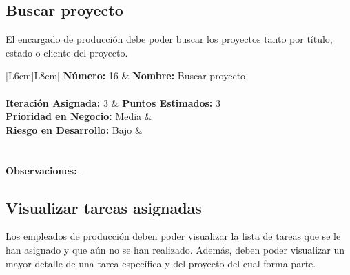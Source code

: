 \documentclass[a4paper, 12pt,twoside]{report}  %
\numberwithin{equation}{subsection} %
\begin{document}
\pagebreak

\subsection*{Buscar proyecto}
El encargado de producción debe poder buscar los proyectos tanto por título, estado o cliente del proyecto.

\renewcommand{\arraystretch}{1.4}

\begin{table}[h!]
	\centering
	\begin{tabularx}
		{\textwidth}{|L{6cm}|L{8cm}|}
		\hline 
		\textbf{Número:} 16 & \textbf{Nombre:} Buscar proyecto \\ \hline
		\\ \hline
		\textbf{Iteración Asignada:} 3 & \textbf{Puntos Estimados:} 3 \\ \hline
		\textbf{Prioridad en Negocio:} Media & \\
		 \textbf{Riesgo en Desarrollo:} Bajo & \\ \hline
		\\
		
		\hline
		\\
		
		\hline
		{\textbf{Observaciones:} - }\\
		
		\hline
	\end{tabularx}
	\caption*{Tabla A.: Refinamiento de \hyperlink{US}{US} 16.}
\end{table}


\pagebreak

\subsection*{Visualizar tareas asignadas}
Los empleados de producción deben poder visualizar la lista de tareas que se le han asignado y que aún no se han realizado. Además, deben poder visualizar un mayor detalle de una tarea específica y del proyecto del cual forma parte.
\end{document}
